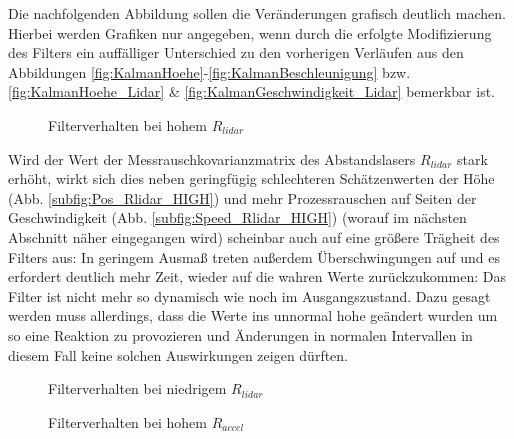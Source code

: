 \documentclass[12pt,a4paper]{article}
\begin{document}
\begin{enumerate}[label=\textbf{\arabic*})]
\begin{enumerate}[label=\textbf{\alph*})]
\begin{table}[!ht]
		\end{table}
		Die nachfolgenden Abbildung sollen die Veränderungen grafisch deutlich machen. Hierbei werden Grafiken nur angegeben, wenn durch die erfolgte Modifizierung des Filters ein auffälliger Unterschied zu den vorherigen Verläufen aus den Abbildungen \ref{fig:KalmanHoehe}-\ref{fig:KalmanBeschleunigung} bzw. \ref{fig:KalmanHoehe_Lidar} \& \ref{fig:KalmanGeschwindigkeit_Lidar} bemerkbar ist.\\
		\begin{figure}[h]
				\hfill	
			\caption{Filterverhalten bei hohem $R_{lidar}$}
			\label{fig:Rlidar_HIGH}
		\end{figure}
	
		Wird der Wert der Messrauschkovarianzmatrix des Abstandslasers $R_{lidar}$ stark erhöht, wirkt sich dies neben geringfügig schlechteren Schätzenwerten der Höhe (Abb. \ref{subfig:Pos_Rlidar_HIGH}) und mehr Prozessrauschen auf Seiten der Geschwindigkeit (Abb. \ref{subfig:Speed_Rlidar_HIGH}) (worauf im nächsten Abschnitt näher eingegangen wird) scheinbar auch auf eine größere Trägheit des Filters aus: In geringem Ausmaß treten außerdem Überschwingungen auf und es erfordert deutlich mehr Zeit, wieder auf die wahren Werte zurückzukommen: Das Filter ist nicht mehr so dynamisch wie noch im Ausgangszustand. Dazu gesagt werden muss allerdings, dass die Werte ins unnormal hohe geändert wurden um so eine Reaktion zu provozieren und Änderungen in normalen Intervallen in diesem Fall keine solchen Auswirkungen zeigen dürften.\\
		\begin{figure}[h]
				\hfill
			\caption{Filterverhalten bei niedrigem $R_{lidar}$}
			\label{fig:Rlidar_LOW}
		\end{figure}
		\begin{figure}[h]
			\caption{Filterverhalten bei hohem $R_{accel}$}
			\label{fig:Raccel_HIGH}
		\end{figure}
	

\end{enumerate}
\end{enumerate}
\end{document}
